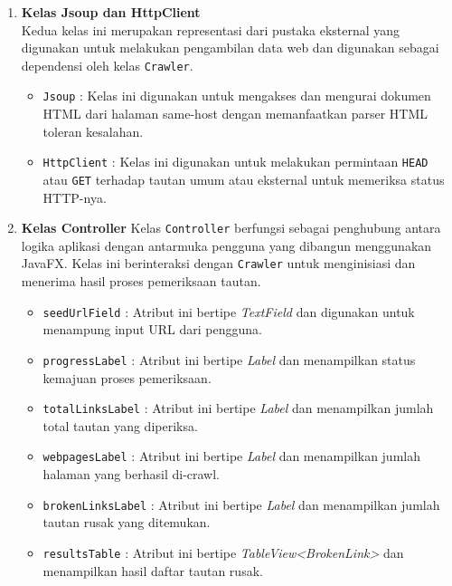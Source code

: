 \begin{enumerate}
    \item \textbf{Kelas Jsoup dan HttpClient}\\
    Kedua kelas ini merupakan representasi dari pustaka eksternal yang digunakan untuk melakukan pengambilan data web dan digunakan sebagai dependensi oleh kelas \texttt{Crawler}.
    \begin{itemize}
        \item \texttt{Jsoup} : Kelas ini digunakan untuk mengakses dan mengurai dokumen HTML dari halaman same-host dengan memanfaatkan parser HTML toleran kesalahan.
        \item \texttt{HttpClient} : Kelas ini digunakan untuk melakukan permintaan \texttt{HEAD} atau \texttt{GET} terhadap tautan umum atau eksternal untuk memeriksa status HTTP-nya.
    \end{itemize}

    \item \textbf{Kelas Controller}  
    Kelas \texttt{Controller} berfungsi sebagai penghubung antara logika aplikasi dengan antarmuka pengguna yang dibangun menggunakan JavaFX. Kelas ini berinteraksi dengan \texttt{Crawler} untuk menginisiasi dan menerima hasil proses pemeriksaan tautan.
    \begin{itemize}
        
        \item \texttt{seedUrlField} : Atribut ini bertipe \textit{TextField} dan digunakan untuk menampung input URL dari pengguna.
            
        \item \texttt{progressLabel} : Atribut ini bertipe \textit{Label} dan menampilkan status kemajuan proses pemeriksaan.
            
        \item \texttt{totalLinksLabel} : Atribut ini bertipe \textit{Label} dan menampilkan jumlah total tautan yang diperiksa.
        
        \item \texttt{webpagesLabel} : Atribut ini bertipe \textit{Label} dan menampilkan jumlah halaman yang berhasil di-crawl.
        
        \item \texttt{brokenLinksLabel} : Atribut ini bertipe \textit{Label} dan menampilkan jumlah tautan rusak yang ditemukan.
        
        \item \texttt{resultsTable} : Atribut ini bertipe \textit{TableView<BrokenLink>} dan menampilkan hasil daftar tautan rusak.
        

\end{itemize}
\end{enumerate}
